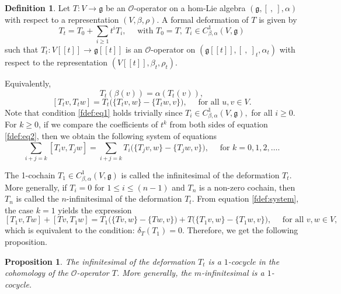 \documentclass[a4paper,11pt]{amsart}
\theoremstyle{plain}
\newtheorem{proposition}[theorem]{Proposition}
\theoremstyle{definition}
\newtheorem{definition}[theorem]{Definition}
\theoremstyle{remark}
\numberwithin{equation}{section}
\begin{document}
\begin{definition}
 Let $T: V\rightarrow \mathfrak{g}$ be an $\mathcal{O}$-operator on a hom-Lie algebra $(\mathfrak{g},[~,~],\alpha)$ with respect to a representation $(V,\beta,\rho)$. A formal deformation of $T$ is given by 
$$\textstyle{T_t=T_0+\sum\limits_{i\geq1}t^i T_i }, \quad\mbox{ with }  T_0=T,~T_i\in C^1_{\beta,\alpha}(V,\mathfrak{g})$$ 
such that $T_t:V[[t]]\rightarrow\mathfrak{g}[[t]]$ is an $\mathcal{O}$-operator on $(\mathfrak{g}[[t]],[~,~]_t,\alpha_t)$ with respect to the representation $(V[[t]],\beta_t,\rho_t)$. 
\end{definition}
Equivalently, 
\begin{equation}\label{fdef:eq1}
T_t(\beta(v))=\alpha (T_t(v)),
\end{equation}
\begin{equation}\label{fdef:eq2}
[T_t v,T_t w]=T_t\big(\{T_t v, w\}-\{T_t w,v\}\big),\quad\mbox{ for all }  u,v\in V.
\end{equation}
Note that condition \eqref{fdef:eq1} holds trivially since $T_i\in C^1_{\beta,\alpha}(V,\mathfrak{g}),$ for all $i\geq 0$. For $k\geq 0$, if we compare the coefficients of $t^k$ from both sides of equation \eqref{fdef:eq2}, then we obtain the following system of equations
\begin{equation}\label{fdef:system}
\sum\limits_{i+j=k}[T_i v,T_j w]=\sum\limits_{i+j=k}T_i\big(\{T_j v, w\}-\{T_j w,v\}\big),\quad\mbox{ for } k=0,1,2,\ldots.
\end{equation}

The 1-cochain $T_1\in C^1_{\beta,\alpha}(V,\mathfrak{g})$ is called the infinitesimal of the deformation $T_t$. More generally, if $T_i=0$ for $1\leq i\leq (n-1)$ and $T_n$ is a non-zero cochain, then $T_n$ is called the $n$-infinitesimal of the deformation $T_t$. From equation \eqref{fdef:system}, the case $k=1$ yields the expression
$$[T_1 v,T w]+[T v,T_1 w]=T_1\big(\{T v, w\}-\{T w,v\}\big)+T\big(\{T_1 v, w\}-\{T_1 w,v\}\big),\quad\mbox{ for all }  v,w\in V,$$
which is equivalent to the condition: $\delta_T(T_1)=0$. Therefore, we get the following proposition.

\begin{proposition}\label{infinitesimal}
The infinitesimal of the deformation $T_t$ is a $1$-cocycle in the cohomology of the $\mathcal{O}$-operator $T$. More generally, the $m$-infinitesimal is a $1$-cocycle. 
\end{proposition}
\end{document}
